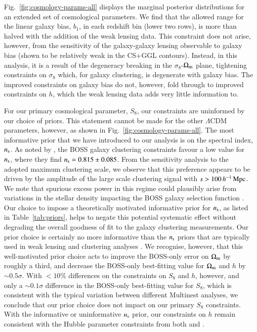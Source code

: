 Fig.~\ref{fig:cosmology-params-all} displays the marginal posterior distributions for an extended set of cosmological parameters.  
We find that the allowed range for the linear galaxy bias,  $b_1$, in each redshift bin (lower two rows), is more than halved with the addition of the weak lensing data. 
This constraint does not arise, however, from the sensitivity of the galaxy-galaxy lensing observable to galaxy bias (shown to be relatively weak in the CS+GGL contours). 
Instead, in this analysis, it is a result of the degeneracy breaking in the $\sigma_8$-$\Omega_{\rm m}$ plane, tightening constraints on $\sigma_8$ which, for galaxy clustering, is degenerate with galaxy bias. 
The improved constraints on galaxy bias do not, however, fold through to improved constraints on $h$, which the weak lensing data adds very little information to. 

For our primary cosmological parameter, $S_8$, our constraints are uninformed by our choice of priors.    This statement cannot be made for the other $\Lambda$CDM parameters, however, as shown in Fig.~\ref{fig:cosmology-params-all}.   The most informative prior that we have introduced to our \tttp analysis is on the spectral index, $n_{\rm s}$.  As noted by \citet{troester/etal:2020}, the BOSS galaxy clustering constraints favour a low value for $n_{\rm s}$, where they find $n_{\rm s} = 0.815 \pm 0.085$. 
From the \citet{troester/etal:2020} sensitivity analysis to the adopted maximum clustering scale, we observe that this preference appears to be driven by the amplitude of the large scale clustering signal with $s > 100 \, h^{-1}\, {\rm Mpc}$.  We note that spurious excess power in this regime could plausibly arise from variations in the stellar density impacting the BOSS galaxy selection function \citep{ross/etal:2017}.  Our choice to impose a theoretically motivated informative prior for $n_{\rm s}$, as listed in Table~\ref{tab:priors}, helps to negate this potential systematic effect without degrading the overall goodness of fit to the galaxy clustering measurements.  Our prior choice is certainly no more informative than the $n_{\rm s}$ priors that are typically used in weak lensing and clustering analyses \citep[see for example][]{abbott/etal:2018}. 
We recognise, however, that this well-motivated prior choice acts to improve the BOSS-only error on $\Omega_{\rm m}$ by roughly a third, and decrease the BOSS-only best-fitting value for $\Omega_{\rm m}$ and $h$ by $\sim 0.5\sigma$.  With $<10\%$ differences on the constraints on $S_8$ and $h$, however, and only a $\sim 0.1\sigma$ difference in the BOSS-only best-fitting value for $S_8$, which is consistent with the typical variation between different {\sc Multinest} analyses, we conclude that our prior choice does not impact on our primary $S_8$ constraints.   With the informative or uninformative $n_{\rm s}$ prior, our constraints on $h$ remain consistent with the Hubble parameter constraints from both \citet{planck/etal:2018} and \citet{riess/etal:2019}.

